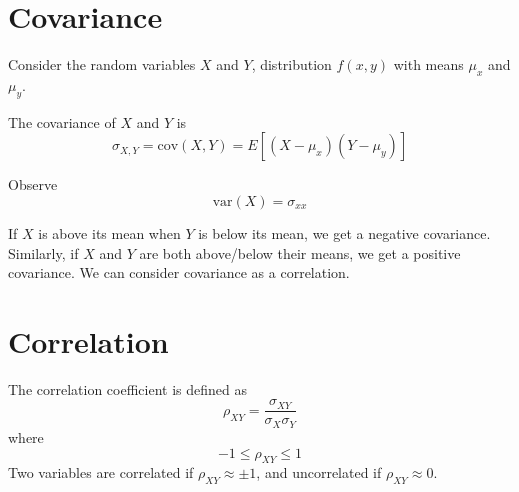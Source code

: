 \documentclass[12pt]{article}
\begin{document}
\section{Covariance}

Consider the random variables $X$ and $Y$, distribution $f(x,y)$ with means $\mu_x$ and $\mu_y$.

\begin{defn}
	The covariance of $X$ and $Y$ is
	$$\sigma_{X,Y} = \text{cov}(X,Y) = E[(X-\mu_x)(Y-\mu_y)]$$
\end{defn}

Observe
$$\text{var}(X) = \sigma_{xx}$$

If $X$ is above its mean when $Y$ is below its mean, we get a negative covariance. Similarly, if $X$ and $Y$ are both above/below their means, we get a positive covariance. We can consider covariance as a correlation.

\section{Correlation}

\begin{defn}
	The correlation coefficient is defined as
	$$\rho_{XY} = \frac{\sigma_{XY}}{\sigma_X\sigma_Y}$$
	where
	$$-1\leq \rho_{XY} \leq 1$$
	Two variables are correlated if $\rho_{XY}\approx\pm1$, and uncorrelated if $\rho_{XY}\approx0$.
\end{defn}
\end{document}
